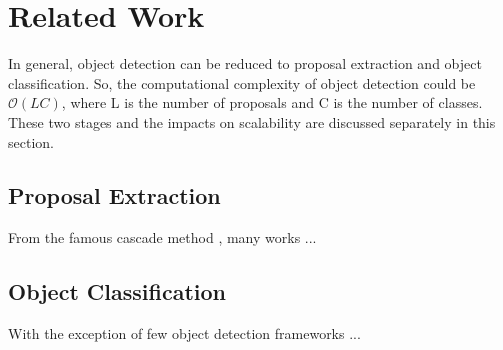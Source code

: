 \chapter{Related Work}
\label{c:relate}

In general, object detection can be reduced to proposal extraction and object classification. So, the computational complexity of object detection could be $\mathcal{O}(LC)$, where L is the number of proposals and C is the number of classes. These two stages and the impacts on scalability are discussed separately in this section.

\section{Proposal Extraction}

From the famous cascade method \cite{viola2001rapid}, many works ...

\section{Object Classification}

With the exception of few object detection frameworks \cite{chen2013efficient, murphy2006object} ...
